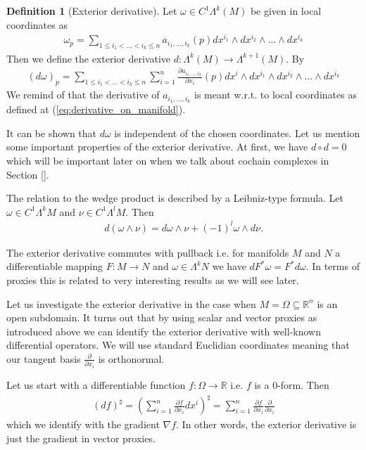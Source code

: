 \documentclass[12pt,a4paper]{article}
\numberwithin{equation}{subsection}
\numberwithin{lemma}{subsection}
\theoremstyle{definition}
\newtheorem{definition}[lemma]{Definition}
\newcommand{\real}{\mathbb{R}}
\begin{document}
\begin{definition}[Exterior derivative]
    Let $\omega \in C^1\Lambda^k (M)$ be given in local coordinates as
    \begin{align*}
        \omega_p = \sum\limits_{1\leq i_1 < ... < i_k \leq n} 
            a_{i_1,...,i_k}(p) dx^{i_1} \wedge dx^{i_2} \wedge ... \wedge dx^{i_k}
    \end{align*}
    Then we define the exterior derivative $d: \Lambda^{k}(M) \rightarrow 
    \Lambda^{k+1}(M)$. By
    \begin{align*}
        (d\omega)_p = \sum\limits_{1\leq i_1 < ... < i_k \leq n} \sum\limits_{i=1}^n
        \frac{\partial a_{i_1,...,i_k}}{\partial x_i}(p) 
        dx^i \wedge dx^{i_1} \wedge dx^{i_2} \wedge ... \wedge dx^{i_k}
    \end{align*}
    We remind of that the derivative of $a_{i_1,...,i_k}$ is meant w.r.t. 
    to local coordinates as defined at (\ref{eq:derivative_on_manifold}).
\end{definition}
It can be shown that $d\omega$ is independent of the chosen coordinates. 
Let us mention some important properties of the exterior derivative. 
At first, we have $d\circ d = 0$ which will be important later on 
when we talk about cochain complexes in Section \ref{}. 

The relation to the wedge product is described by a Leibniz-type formula. 
Let $\omega \in C^1 \Lambda^k M$ and $\nu \in C^1 \Lambda^l M$. Then
\begin{align}
    d (\omega \wedge \nu) = d\omega \wedge \nu + (-1)^l \omega \wedge d\nu.
    \label{eq:leibniz_formula}
\end{align}

The exterior derivative commutes with pullback i.e. 
for manifolds $M$ and $N$ a differentiable mapping $F:M \rightarrow N$ 
and $\omega \in \Lambda^k N$ we have $dF^* \omega = F^* d\omega$. 
In terms of proxies this is related to very interesting results as we will 
see later. 


Let us investigate the exterior derivative in the case when 
$M = \Omega \subseteq \real^n$ is an open subdomain. It turns out that by using 
scalar and vector proxies as introduced above we can identify the exterior 
derivative with well-known differential operators. We will use standard 
Euclidian coordinates meaning that our tangent basis $\frac{\partial}{\partial x_i}$
is orthonormal. 

Let us start with a differentiable function $f: \Omega \rightarrow \real$ i.e. 
$f$ is a $0$-form. Then
\begin{align*}
    (df)^\sharp = \left( \sum_{i=1}^n \frac{\partial f}{\partial x_i} dx^i 
        \right)^\sharp
    = \sum_{i=1}^n \frac{\partial f}{\partial x_i} \frac{\partial}{\partial x_i}
\end{align*}
which we identify with the gradient $\nabla f$. In other words, 
the exterior derivative is just the gradient in vector proxies.
\end{document}
